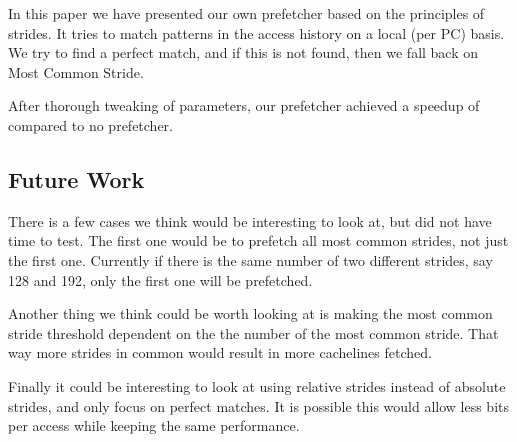 In this paper we have presented our own prefetcher based on the principles of strides. It tries to match patterns in the access history on a local (per PC) basis. We try to find a perfect match, and if this is not found, then we fall back on Most Common Stride.

After thorough tweaking of parameters, our prefetcher achieved a speedup of \speedup compared to no prefetcher. 

\subsection{Future Work}
There is a few cases we think would be interesting to look at, but did not have
time to test. The first one would be to prefetch all most common strides, not
just the first one. Currently if there is the same number of two different
strides, say 128 and 192, only the first one will be prefetched.

Another thing we think could be worth looking at is making the most common
stride threshold dependent on the the number of the most common stride.
That way more strides in common would result in more cachelines fetched.

Finally it could be interesting to look at using relative strides instead of
absolute strides, and only focus on perfect matches. It is possible this would
allow less bits per access while keeping the same performance.

